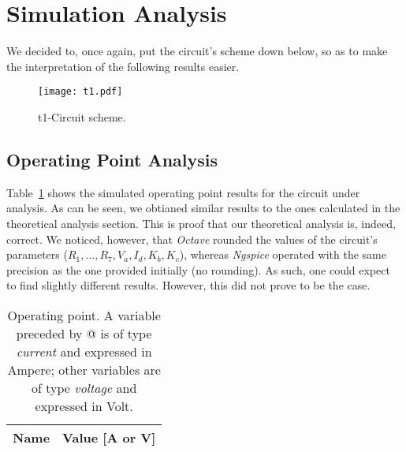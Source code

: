\newpage
\section{Simulation Analysis}
\label{sec:simulation}

We decided to, once again, put the circuit's scheme down below, so as to make the interpretation of the following results easier.
\begin{figure}[h] \centering
  \texttt{[image: t1.pdf]}
  \caption{t1-Circuit scheme.}
  \label{fig:op}
\end{figure}

\subsection{Operating Point Analysis}

Table~\ref{tab:op} shows the simulated operating point results for the circuit
under analysis. As can be seen, we obtianed similar results to the ones calculated in the theoretical analysis section. This is proof that our theoretical analysis is, indeed, correct.
We noticed, however, that \emph{Octave} rounded the values of the circuit's parameters ($R_{1}, ..., R_{7}, V_{a}, I_{d}, K_{b}, K_{c}$), whereas \emph{Ngspice} operated with the same precision as the one provided initially (no rounding).
As such, one could expect to find slightly different results. However, this did not prove to be the case.

\begin{table}[h]
  \centering
  \begin{tabular}{|l|r|}
    \hline    
    {\bf Name} & {\bf Value [A or V]} \\ \hline
    
  \end{tabular}
  \caption{Operating point. A variable preceded by @ is of type {\em current}
    and expressed in Ampere; other variables are of type {\it voltage} and expressed in
    Volt.}
  \label{tab:op}
\end{table}




